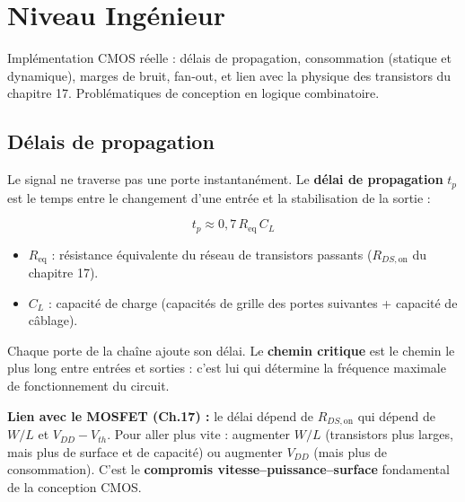 \documentclass[12pt,a4paper,twoside]{book}
\begin{document}
\section{Niveau Ingénieur}

\begin{ingenieur}
Implémentation CMOS réelle : délais de propagation, consommation (statique et dynamique), marges de bruit, fan-out, et lien avec la physique des transistors du chapitre 17. Problématiques de conception en logique combinatoire.
\end{ingenieur}

\subsection{Délais de propagation}

\begin{formule}
Le signal ne traverse pas une porte instantanément. Le \textbf{délai de propagation} $t_p$ est le temps entre le changement d'une entrée et la stabilisation de la sortie :

\[
\boxed{t_p \approx 0{,}7\,R_{\text{eq}}\,C_L}
\]

\begin{itemize}[nosep]
\item $R_{\text{eq}}$ : résistance équivalente du réseau de transistors passants ($R_{DS,\text{on}}$ du chapitre 17).
\item $C_L$ : capacité de charge (capacités de grille des portes suivantes + capacité de câblage).
\end{itemize}

Chaque porte de la chaîne ajoute son délai. Le \textbf{chemin critique} est le chemin le plus long entre entrées et sorties : c'est lui qui détermine la fréquence maximale de fonctionnement du circuit.
\end{formule}

\begin{intuition}
\textbf{Lien avec le MOSFET (Ch.17) :} le délai dépend de $R_{DS,\text{on}}$ qui dépend de $W/L$ et $V_{DD} - V_{th}$. Pour aller plus vite : augmenter $W/L$ (transistors plus larges, mais plus de surface et de capacité) ou augmenter $V_{DD}$ (mais plus de consommation). C'est le \textbf{compromis vitesse--puissance--surface} fondamental de la conception CMOS.
\end{intuition}
\end{document}
